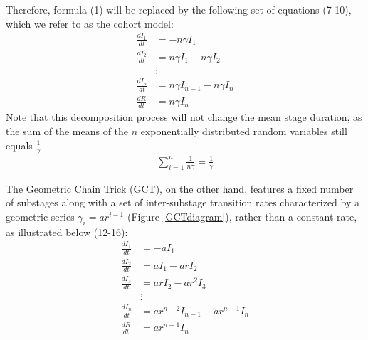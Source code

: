 \documentclass[12pt]{article}
\begin{document}
Therefore, formula (1) will be replaced by the following set of equations (7-10), which we refer to as the cohort model:
\begin{align}
    \frac{dI_1}{dt} &= - n \gamma I_1 \\
    \frac{dI_2}{dt} &= n\gamma I_1 - n \gamma I_2 \\
    &\vdots \\
    \frac{dI_n}{dt} &= n\gamma I_{n-1} - n \gamma I_n \\
    \frac{dR}{dt} &= n \gamma I_n
\end{align}
Note that this decomposition process will not change the mean stage duration, as the sum of the means of the $n$ exponentially distributed random variables still equals $\frac{1}{\gamma}$
\begin{align*}
    \sum_{i=1}^{n} \frac{1}{n\gamma} = \frac{1}{\gamma}
\end{align*}

The Geometric Chain Trick (GCT), on the other hand, features a fixed number of substages along with a set of inter-substage transition rates characterized by a geometric series $\gamma_i = ar^{i-1}$ (Figure \ref{GCTdiagram}), rather than a constant rate, as illustrated below (12-16):
\begin{align}
    \frac{dI_1}{dt} &= - a I_1 \\
    \frac{dI_2}{dt} &= a I_1 - ar I_2 \\
    \frac{dI_3}{dt} &= ar I_2 - ar^2 I_3 \\
    &\vdots \\
    \frac{dI_n}{dt} &= ar^{n-2} I_{n-1} - ar^{n-1} I_n \\
    \frac{dR}{dt} &= ar^{n-1} I_n
\end{align}
\end{document}
